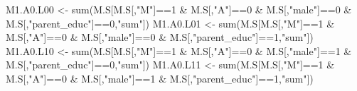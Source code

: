 \documentclass[
]{book}
\newenvironment{Shaded}{\begin{snugshade}}{\end{snugshade}}
\newcommand{\DecValTok}[1]{\textcolor[rgb]{0.00,0.00,0.81}{#1}}
\newcommand{\FunctionTok}[1]{\textcolor[rgb]{0.00,0.00,0.00}{#1}}
\newcommand{\NormalTok}[1]{#1}
\newcommand{\OtherTok}[1]{\textcolor[rgb]{0.56,0.35,0.01}{#1}}
\newcommand{\SpecialCharTok}[1]{\textcolor[rgb]{0.00,0.00,0.00}{#1}}
\newcommand{\StringTok}[1]{\textcolor[rgb]{0.31,0.60,0.02}{#1}}
\begin{document}
\begin{Shaded}
\begin{Highlighting}[]
\NormalTok{  M1.A0.L00 }\OtherTok{\textless{}{-}} \FunctionTok{sum}\NormalTok{(M.S[M.S[,}\StringTok{"M"}\NormalTok{]}\SpecialCharTok{==}\DecValTok{1} \SpecialCharTok{\&}\NormalTok{ M.S[,}\StringTok{"A"}\NormalTok{]}\SpecialCharTok{==}\DecValTok{0} \SpecialCharTok{\&}\NormalTok{ M.S[,}\StringTok{"male"}\NormalTok{]}\SpecialCharTok{==}\DecValTok{0} \SpecialCharTok{\&} 
\NormalTok{                         M.S[,}\StringTok{"parent\_educ"}\NormalTok{]}\SpecialCharTok{==}\DecValTok{0}\NormalTok{,}\StringTok{"sum"}\NormalTok{])}
\NormalTok{  M1.A0.L01 }\OtherTok{\textless{}{-}} \FunctionTok{sum}\NormalTok{(M.S[M.S[,}\StringTok{"M"}\NormalTok{]}\SpecialCharTok{==}\DecValTok{1} \SpecialCharTok{\&}\NormalTok{ M.S[,}\StringTok{"A"}\NormalTok{]}\SpecialCharTok{==}\DecValTok{0} \SpecialCharTok{\&}\NormalTok{ M.S[,}\StringTok{"male"}\NormalTok{]}\SpecialCharTok{==}\DecValTok{0} \SpecialCharTok{\&} 
\NormalTok{                         M.S[,}\StringTok{"parent\_educ"}\NormalTok{]}\SpecialCharTok{==}\DecValTok{1}\NormalTok{,}\StringTok{"sum"}\NormalTok{])}
\NormalTok{  M1.A0.L10 }\OtherTok{\textless{}{-}} \FunctionTok{sum}\NormalTok{(M.S[M.S[,}\StringTok{"M"}\NormalTok{]}\SpecialCharTok{==}\DecValTok{1} \SpecialCharTok{\&}\NormalTok{ M.S[,}\StringTok{"A"}\NormalTok{]}\SpecialCharTok{==}\DecValTok{0} \SpecialCharTok{\&}\NormalTok{ M.S[,}\StringTok{"male"}\NormalTok{]}\SpecialCharTok{==}\DecValTok{1} \SpecialCharTok{\&} 
\NormalTok{                         M.S[,}\StringTok{"parent\_educ"}\NormalTok{]}\SpecialCharTok{==}\DecValTok{0}\NormalTok{,}\StringTok{"sum"}\NormalTok{])}
\NormalTok{  M1.A0.L11 }\OtherTok{\textless{}{-}} \FunctionTok{sum}\NormalTok{(M.S[M.S[,}\StringTok{"M"}\NormalTok{]}\SpecialCharTok{==}\DecValTok{1} \SpecialCharTok{\&}\NormalTok{ M.S[,}\StringTok{"A"}\NormalTok{]}\SpecialCharTok{==}\DecValTok{0} \SpecialCharTok{\&}\NormalTok{ M.S[,}\StringTok{"male"}\NormalTok{]}\SpecialCharTok{==}\DecValTok{1} \SpecialCharTok{\&} 
\NormalTok{                         M.S[,}\StringTok{"parent\_educ"}\NormalTok{]}\SpecialCharTok{==}\DecValTok{1}\NormalTok{,}\StringTok{"sum"}\NormalTok{])}


\end{Highlighting}
\end{Shaded}
\end{document}

